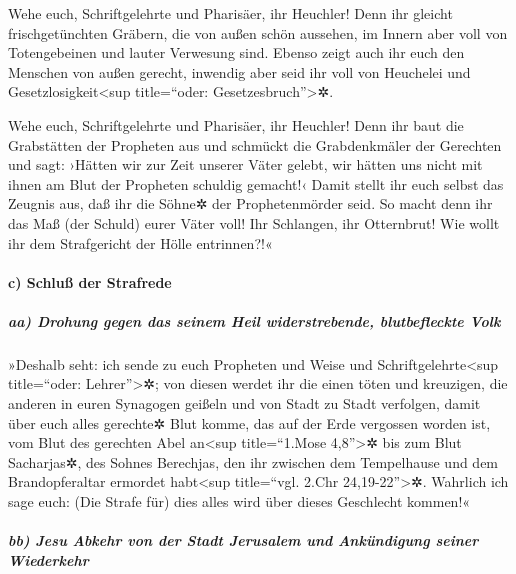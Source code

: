  Wehe euch, Schriftgelehrte und Pharisäer, ihr Heuchler!
Denn ihr gleicht frischgetünchten Gräbern, die von außen schön aussehen,
im Innern aber voll von Totengebeinen und lauter Verwesung sind.
 Ebenso zeigt auch ihr euch den Menschen von außen
gerecht, inwendig aber seid ihr voll von Heuchelei und
Gesetzlosigkeit\textless sup title=``oder: Gesetzesbruch''\textgreater✲.

 Wehe euch, Schriftgelehrte und Pharisäer, ihr Heuchler!
Denn ihr baut die Grabstätten der Propheten aus und schmückt die
Grabdenkmäler der Gerechten  und sagt: ›Hätten wir zur
Zeit unserer Väter gelebt, wir hätten uns nicht mit ihnen am Blut der
Propheten schuldig gemacht!‹  Damit stellt ihr euch
selbst das Zeugnis aus, daß ihr die Söhne✲ der Prophetenmörder seid.
 So macht denn ihr das Maß (der Schuld) eurer Väter voll!
 Ihr Schlangen, ihr Otternbrut! Wie wollt ihr dem
Strafgericht der Hölle entrinnen?!«

\hypertarget{c-schluuxdf-der-strafrede}{%
\paragraph{c) Schluß der Strafrede}\label{c-schluuxdf-der-strafrede}}

\hypertarget{aa-drohung-gegen-das-seinem-heil-widerstrebende-blutbefleckte-volk}{%
\subparagraph{aa) Drohung gegen das seinem Heil widerstrebende,
blutbefleckte
Volk}\label{aa-drohung-gegen-das-seinem-heil-widerstrebende-blutbefleckte-volk}}

 »Deshalb seht: ich sende zu euch Propheten und Weise und
Schriftgelehrte\textless sup title=``oder: Lehrer''\textgreater✲; von
diesen werdet ihr die einen töten und kreuzigen, die anderen in euren
Synagogen geißeln und von Stadt zu Stadt verfolgen, 
damit über euch alles gerechte✲ Blut komme, das auf der Erde vergossen
worden ist, vom Blut des gerechten Abel an\textless sup title=``1.Mose
4,8''\textgreater✲ bis zum Blut Sacharjas✲, des Sohnes Berechjas, den
ihr zwischen dem Tempelhause und dem Brandopferaltar ermordet
habt\textless sup title=``vgl. 2.Chr 24,19-22''\textgreater✲.
 Wahrlich ich sage euch: (Die Strafe für) dies alles wird
über dieses Geschlecht kommen!«

\hypertarget{bb-jesu-abkehr-von-der-stadt-jerusalem-und-ankuxfcndigung-seiner-wiederkehr}{%
\subparagraph{bb) Jesu Abkehr von der Stadt Jerusalem und Ankündigung
seiner
Wiederkehr}\label{bb-jesu-abkehr-von-der-stadt-jerusalem-und-ankuxfcndigung-seiner-wiederkehr}}

